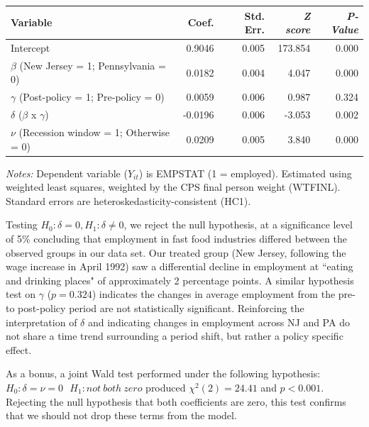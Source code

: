 \documentclass[11pt]{article}
\begin{document}
\begin{table}[htbp]
  \centering
  \small %
  \setlength{\tabcolsep}{8pt} %
  \begin{tabular}{l r r r r}
    \toprule
    \textbf{Variable} & \textbf{Coef.} & \textbf{Std. Err.} & \textbf{\textit{Z score}} & \textbf{\textit{P-Value}}\\
    \midrule
    Intercept & 0.9046 & 0.005 &  173.854 & 0.000 \\
    $\beta$ (New Jersey = 1; Pennsylvania = 0) &  0.0182 & 0.004 &    4.047 & 0.000 \\
    $\gamma$ (Post-policy = 1; Pre-policy = 0) &  0.0059 & 0.006 & 0.987 & 0.324 \\
    $\delta$ ($\beta$ x $\gamma$) & -0.0196 & 0.006 &   -3.053 & 0.002 \\
    $\nu$ (Recession window = 1; Otherwise = 0) &  0.0209 & 0.005 & 3.840 & 0.000 \\
    \bottomrule
  \end{tabular}
  \begin{tablenotes}
  \footnotesize
  \item \textit{Notes:} Dependent variable ($Y_{it}$) is EMPSTAT (1 = employed). Estimated using weighted least squares, weighted by the CPS final person weight (WTFINL). Standard errors are heteroskedasticity-consistent (HC1).
  \end{tablenotes}
\end{table}

Testing $H_0: \delta = 0, H_1:  \delta \neq 0$, we reject the null hypothesis, at a significance level of 5\% concluding that employment in fast food industries differed between the observed groups in our data set. Our treated group (New Jersey, following the wage increase in April 1992) saw a differential decline in employment at ``eating and drinking places" of approximately 2 percentage points. A similar hypothesis test on $\gamma$ ($p= 0.324$) indicates the changes in average employment from the pre- to post-policy period are not statistically significant. Reinforcing the interpretation of $\delta$ and indicating changes in employment across NJ and PA do not share a time trend surrounding a period shift, but rather a policy specific effect.

As a bonus, a joint Wald test performed under the following hypothesis: $ H_{0}: \delta = \nu = 0\ \ \ H_{1}: not\ both\ zero$ produced $\chi^2(2) = 24.41$ and $p < 0.001$. Rejecting the null hypothesis that both coefficients are zero, this test confirms that we should not drop these terms from the model. 
\end{document}
